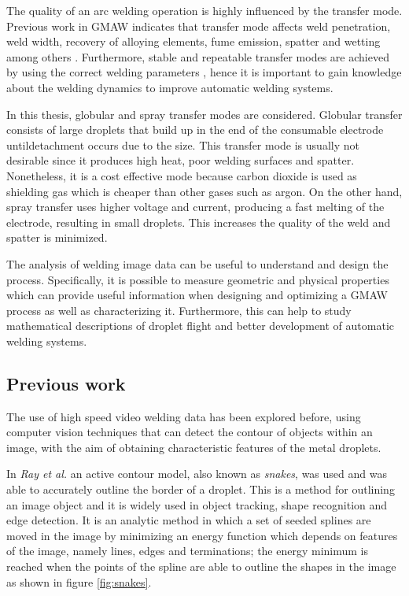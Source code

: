 The quality of an arc welding operation is highly influenced by the transfer mode. Previous work in GMAW indicates that transfer mode affects weld penetration, weld width, recovery of alloying elements, fume emission, spatter and wetting among others \cite{lancaster, mendez2015}. Furthermore, stable and repeatable transfer modes are achieved by using the correct welding parameters \cite{zhang2}, hence it is important to gain knowledge about the welding dynamics to improve automatic welding systems.

In this thesis, globular and spray transfer modes are considered. Globular transfer consists of large droplets that build up in the end of the consumable electrode untildetachment occurs due to the size. This transfer mode is usually not desirable since it produces high heat, poor welding surfaces and spatter. Nonetheless, it is a cost effective mode because carbon dioxide is used as shielding gas which is cheaper than other gases such as argon. On the other hand, spray transfer uses higher voltage and current, producing a fast melting of the electrode, resulting in small droplets. This increases the quality of the weld and spatter is minimized.

The analysis of welding image data can be useful to understand and design the process. Specifically, it is possible to measure geometric and physical properties which  can provide useful information when designing and optimizing a GMAW process as well as characterizing it. Furthermore, this can help to study mathematical descriptions of droplet flight and better development of automatic welding systems.

\subsection{Previous work}

The use of high speed video welding data has been explored before, using computer vision techniques that can detect the contour of objects within an image, with the aim of obtaining characteristic features of the metal droplets. 

In \textit{Ray et al.} \cite{Ray} an active contour model, also known as \textit{snakes}, was used and was able to accurately outline the border of a droplet. This is a method for outlining an image object and it is widely used in object tracking, shape recognition and edge detection. It is an analytic method in which a set of seeded splines are moved in the image by minimizing an energy function which depends on features of the image, namely lines, edges and terminations; the energy minimum is reached when the points of the spline are able to outline the shapes in the image \cite{Kass} as shown in figure \ref{fig:snakes}.

